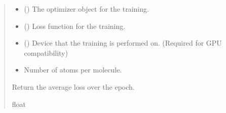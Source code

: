 \documentclass[a4paper,10pt,english]{report}
\begin{document}
\begin{fulllineitems}
\begin{quote}
\begin{description}
\begin{itemize}
\item {} 
\sphinxAtStartPar
{} () \textendash{} The optimizer object for the training.

\item {} 
\sphinxAtStartPar
{} () \textendash{} Loss function for the training.

\item {} 
\sphinxAtStartPar
{} () \textendash{} Device that the training is performed on. (Required for GPU compatibility)

\item {} 
\sphinxAtStartPar
{} \textendash{} Number of atoms per molecule.

\end{itemize}

\sphinxAtStartPar
Return the average loss over the epoch.

\sphinxAtStartPar
float

\end{description}\end{quote}

\end{fulllineitems}

\end{document}
